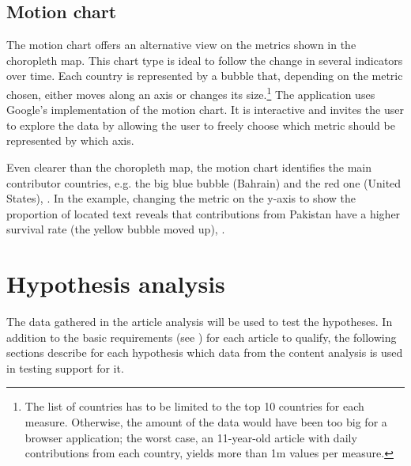 
\subsection{Motion chart}

The motion chart offers an alternative view on the metrics shown in the choropleth map.
This chart type is ideal to follow the change in several indicators over time.
Each country is represented by a bubble that, depending on the metric chosen, either moves along an axis or changes its size.\footnote{The list of countries has to be limited to the top 10 countries for each measure. Otherwise, the amount of the data would have been too big for a browser application; the worst case, an 11-year-old article with daily contributions from each country, yields more than 1m values per measure.}
The application uses Google's implementation of the motion chart.
It is interactive and invites the user to explore the data by allowing the user to freely choose which metric should be represented by which axis.


Even clearer than the choropleth map, the motion chart identifies the main contributor countries, e.g. the big blue bubble (Bahrain) and the red one (United States), .
In the example, changing the metric on the y-axis to show the proportion of located text reveals that contributions from Pakistan have a higher survival rate (the yellow bubble moved up), . 



\section{Hypothesis analysis}\label{hypothesesanalysis}

The data gathered in the article analysis will be used to test the hypotheses.
In addition to the basic requirements (see ) for each article to qualify, the following sections describe for each hypothesis which data from the content analysis is used in testing support for it.

